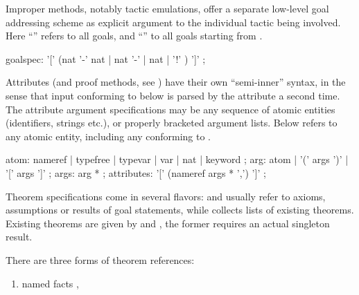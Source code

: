 \begin{isabellebody}
\begin{isamarkuptext}
  Improper methods, notably tactic emulations, offer a separate
  low-level goal addressing scheme as explicit argument to the
  individual tactic being involved.  Here ``\isa{{\isachardoublequote}{\isacharbrackleft}{\isacharbang}{\isacharbrackright}{\isachardoublequote}}'' refers to
  all goals, and ``'' to all goals starting from .

  \begin{rail}
    goalspec: '[' (nat '-' nat | nat '-' | nat | '!' ) ']'
    ;
  \end{rail}%
\end{isamarkuptext}%
\isamarkuptrue%
%
\isamarkuptrue%
%
\begin{isamarkuptext}%
Attributes (and proof methods, see ) have their
  own ``semi-inner'' syntax, in the sense that input conforming to
   below is parsed by the attribute a second time.
  The attribute argument specifications may be any sequence of atomic
  entities (identifiers, strings etc.), or properly bracketed argument
  lists.  Below  refers to any atomic entity, including
  any  conforming to .

  \begin{rail}
    atom: nameref | typefree | typevar | var | nat | keyword
    ;
    arg: atom | '(' args ')' | '[' args ']'
    ;
    args: arg *
    ;
    attributes: '[' (nameref args * ',') ']'
    ;
  \end{rail}

  Theorem specifications come in several flavors:
   and  usually refer to
  axioms, assumptions or results of goal statements, while
   collects lists of existing theorems.  Existing
  theorems are given by  and
  , the former requires an actual singleton
  result.

  There are three forms of theorem references:
  \begin{enumerate}
  
  \item named facts ,


\end{enumerate}
\end{isamarkuptext}
\end{isabellebody}
